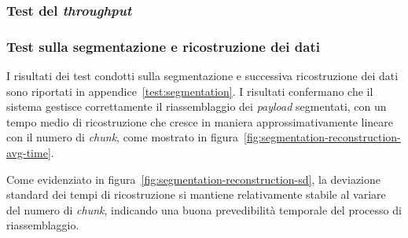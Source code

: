 \documentclass[12pt,a4paper,twoside]{book}
\begin{document}
\subsubsection{Test del \emph{throughput}}

\subsubsection{Test sulla segmentazione e ricostruzione dei dati}
I risultati dei test condotti sulla segmentazione e successiva ricostruzione dei dati
sono riportati in appendice~\ref{test:segmentation}. I risultati confermano che il
sistema gestisce correttamente il riassemblaggio dei \emph{payload} segmentati, con
un tempo medio di ricostruzione che cresce in maniera approssimativamente lineare con
il numero di \emph{chunk}, come mostrato in figura~\ref{fig:segmentation-reconstruction-avg-time}.

Come evidenziato in figura~\ref{fig:segmentation-reconstruction-sd}, la deviazione standard
dei tempi di ricostruzione si mantiene relativamente stabile al variare del numero di \emph{chunk},
indicando una buona prevedibilità temporale del processo di riassemblaggio.
\end{document}
